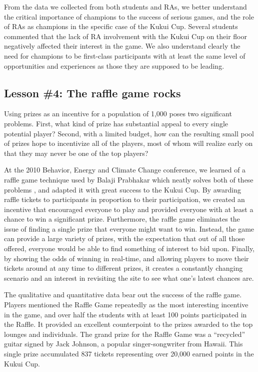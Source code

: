 \documentclass{acm_proc_article-sp}
\begin{document}
From the data we collected from both students and RAs, we better understand the critical importance of champions to the success of serious games, and the role of RAs as champions in the specific case of the Kukui Cup.  Several students commented that the lack of RA involvement with the Kukui Cup on their floor negatively affected their interest in the game.  We also understand clearly the need for champions to be first-class participants with at least the same level of opportunities and experiences as those they are supposed to be leading.

\subsection{Lesson \#4: The raffle game rocks}

Using prizes as an incentive for a population of 1,000 poses two significant problems.  First, what kind of prize has substantial appeal to every single potential player?  Second, with a limited budget, how can the resulting small pool of prizes hope to incentivize all of the players, most of whom will realize early on that they may never be one of the top players?

At the 2010 Behavior, Energy and Climate Change conference, we learned of a raffle game technique used by Balaji Prabhakar which neatly solves both of these problems \cite{Merugu2009}, and adapted it with great success to the Kukui Cup.  By awarding raffle tickets to participants in proportion to their participation, we created an incentive that encouraged everyone to play and provided everyone with at least a chance to win a significant prize.   Furthermore, the raffle game eliminates the issue of finding a single prize that everyone might want to win. Instead, the game can provide a large variety of prizes, with the expectation that out of all those offered, everyone would be able to find something of interest to bid upon.  Finally, by showing the odds of winning in real-time, and allowing players to move their tickets around at any time to different prizes, it creates a constantly changing scenario and an interest in revisiting the site to see what one's latest chances are. 

The qualitative and quantitative data bear out the success of the raffle game.  Players mentioned the Raffle Game repeatedly as the most interesting incentive in the game, and over half the students with at least 100 points participated in the Raffle.   It provided an excellent counterpoint to the prizes awarded to the top lounges and individuals. The grand prize for the Raffle Game was a ``recycled'' guitar signed by Jack Johnson, a popular singer-songwriter from Hawaii. This single prize accumulated 837 tickets representing over 20,000 earned points in the Kukui Cup.
\end{document}
